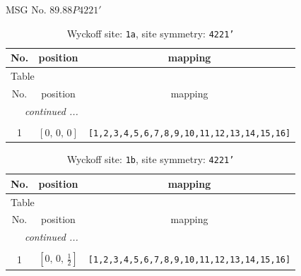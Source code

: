\documentclass[fleqn,8pt]{jsarticle}
\begin{document}
\setcounter{MaxMatrixCols}{32}

\renewcommand{\tablename}{Table~}
\renewcommand{\figurename}{Figure~}
\begin{center}
\LARGE
MSG No. 89.88\quad$P4221'$
\end{center}
\renewcommand{\arraystretch}{1.2}
\begin{longtable}{ccc}
\caption{Wyckoff site: {\tt 1a}, site symmetry: {\tt 4221'}}
 \\
 \hline \hline
No. & position & mapping \\ \hline \endfirsthead

\multicolumn{2}{l}{\tablename\ \thetable{}} \\
 \hline \hline
No. & position & mapping \\ \hline \endhead

 \hline \hline
\multicolumn{2}{r}{\footnotesize\it continued ...} \\ \endfoot

 \hline \hline
\multicolumn{2}{r}{} \\ \endlastfoot

1 & $\left[ 0,\, 0,\, 0 \right]$ & {\tt [1,2,3,4,5,6,7,8,9,10,11,12,13,14,15,16]} \\
\end{longtable}
\renewcommand{\arraystretch}{1.2}
\begin{longtable}{ccc}
\caption{Wyckoff site: {\tt 1b}, site symmetry: {\tt 4221'}}
 \\
 \hline \hline
No. & position & mapping \\ \hline \endfirsthead

\multicolumn{2}{l}{\tablename\ \thetable{}} \\
 \hline \hline
No. & position & mapping \\ \hline \endhead

 \hline \hline
\multicolumn{2}{r}{\footnotesize\it continued ...} \\ \endfoot

 \hline \hline
\multicolumn{2}{r}{} \\ \endlastfoot

1 & $\left[ 0,\, 0,\, \frac{1}{2} \right]$ & {\tt [1,2,3,4,5,6,7,8,9,10,11,12,13,14,15,16]} \\
\end{longtable}
\renewcommand{\arraystretch}{1.2}
\end{document}
